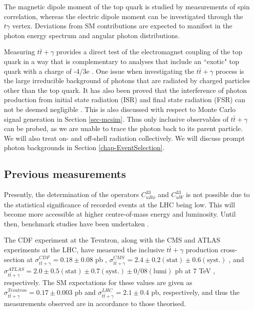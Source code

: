 The magnetic dipole moment of the top quark is studied by measurements of spin correlation, whereas the electric dipole moment can be investigated through the $t\gamma$ vertex. Deviations from SM contributions are expected to manifest in the photon energy spectrum and angular photon distributions.

Measuring $t\bar{t}+\gamma$ provides a direct test of the electromagnet coupling of the top quark in a way that is complementary to analyses that include an ``exotic" top quark with a charge of -4/3e \cite{top-charge}. One issue when investigating the $t\bar{t}+\gamma$ process is the large irreducible background of photons that are radiated by charged particles other than the top quark. It has also been proved that the interference of photon production from initial state radiation (ISR) and final state radiation (FSR) can not be deemed negligible \cite{topchargemeasurement}. This is also discussed with respect to Monte Carlo signal generation in Section \ref{sec-mcsim}. Thus only inclusive observables of $t\bar{t}+\gamma$ can be probed, as we are unable to trace the photon back to its parent particle. We will also treat on- and off-shell radiation collectively. We will discuss prompt photon backgrounds in Section \ref{chap-EventSelection}. 

\subsection{Previous measurements}

Presently, the determination of the operators $C^{33}_{uB\phi}$ and $C^{33}_{uW}$ is not possible due to the statistical significance of recorded events at the LHC being low. This will become more accessible at higher centre-of-mass energy and luminosity. Until then, benchmark studies have been undertaken \cite{pidsemilept}.

The CDF experiment at the Tevatron, along with the CMS and ATLAS experiments at the LHC, have measured the inclusive $t\bar{t}+\gamma$ production cross-section at $\sigma^{CDF}_{t\bar{t}+\gamma} = 0.18 \pm 0.08$ pb \cite{CDFttgamma}, $\sigma^{CMS}_{t\bar{t}+\gamma} = 2.4 \pm 0.2 (\text{stat}) \pm 0.6 (\text{syst.})$ \cite{CMS-PAS-TOP-13-011}, and $\sigma^{ATLAS}_{t\bar{t}+\gamma} = 2.0 \pm 0.5 (\text{stat}) \pm 0.7 (\text{syst.}) \pm 0/08 (\text{lumi})$ pb at 7 TeV \cite{ATLASttgamma}, respectively. The SM expectations for these values are given as $\sigma^{Tevatron}_{t\bar{t}+\gamma} = 0.17 \pm 0.003$ pb and $\sigma^{LHC}_{t\bar{t}+\gamma} = 2.1 \pm 0.4$ pb, respectively, and thus the measurements observed are in accordance to those theorised. 

